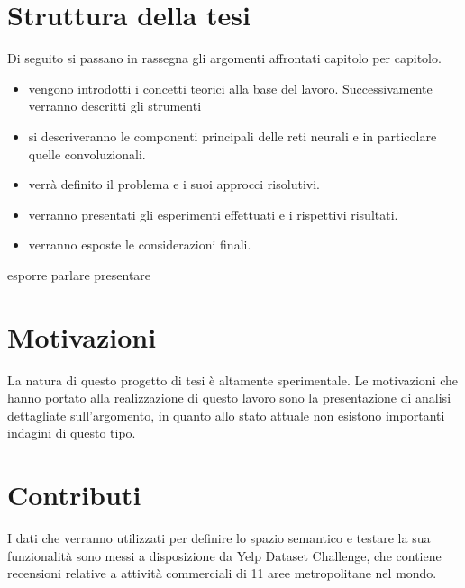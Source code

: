 \section*{Struttura della tesi}
{\color{green}Di seguito si passano in rassegna gli argomenti affrontati capitolo per capitolo.

\begin{itemize}
	\item [\setfont{\bfseries Nel  capitolo \nameref{chap:contesto}}] vengono introdotti i concetti teorici alla base del lavoro. Successivamente verranno descritti gli strumenti 
	\item [\setfont{\bfseries Nel capitolo \nameref{chap:RetiNeurali}}] si descriveranno le componenti principali delle reti neurali e in particolare quelle convoluzionali. 
	\item [\setfont{\bfseries Nel capitolo \nameref{chap:formulazione}}] verrà definito il problema e i suoi approcci risolutivi.
	\item [\setfont{\bfseries Nel capitolo \nameref{chap:esperimenti}}] verranno presentati gli esperimenti effettuati e i rispettivi risultati.
	\item [\setfont{\bfseries Nel capitolo \nameref{chap:conclusioni}}] verranno esposte le considerazioni finali.
\end{itemize}
esporre
parlare
presentare

\section*{Motivazioni}
\label{sec:motivazione}

La natura di questo progetto di tesi è altamente sperimentale. Le motivazioni che hanno portato alla realizzazione di questo lavoro sono la presentazione di analisi dettagliate sull'argomento, in quanto allo stato attuale non esistono importanti indagini di questo tipo.

\section*{Contributi}
\label{sec:contributi}

I dati che verranno utilizzati per definire lo spazio semantico e testare la sua funzionalità sono messi a disposizione da Yelp Dataset Challenge, che contiene  recensioni relative a  attività commerciali di 11 aree metropolitane nel mondo. 
}